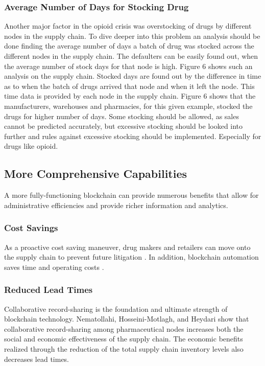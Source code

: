 \documentclass[sigconf]{acmart}
\begin{document}
\subsubsection{Average Number of Days for Stocking Drug } 
Another major factor in the opioid crisis was overstocking of drugs by different nodes in the supply chain. To dive deeper into this problem an analysis should be done finding the average number of days a batch of drug was stocked across the different nodes in the supply chain. The defaulters can be easily found out, when the average number of stock days for that node is high. Figure 6 shows such an analysis on the supply chain. Stocked days are found out by the difference in time as to when the batch of drugs arrived that node and when it left the node. This time data is provided by each node in the supply chain. Figure 6 shows that the manufacturers, warehouses and pharmacies, for this given example, stocked the drugs for higher number of days. Some stocking should be allowed, as sales cannot be predicted accurately, but excessive stocking should be looked into further and rules against excessive stocking should be implemented. Especially for drugs like opioid.

\subsection{More Comprehensive Capabilities}
A more fully-functioning blockchain can provide numerous benefits that allow for administrative efficiencies and provide richer information and analytics.

\subsubsection{Cost Savings} As a proactive cost saving maneuver, drug makers and retailers can move onto the supply chain to prevent future litigation \cite{Noguchi01}. In addition, blockchain automation saves time and operating costs \cite{Hyperledger01}.  

\subsubsection{Reduced Lead Times} Collaborative record-sharing is the foundation and ultimate strength of blockchain technology. Nematollahi, Hosseini-Motlagh, and Heydari \cite{Nematollahi01} show that collaborative record-sharing among pharmaceutical nodes increases both the social and economic effectiveness of the supply chain. The economic benefits realized through the reduction of the total supply chain inventory levels also decreases lead times. 
\end{document}
